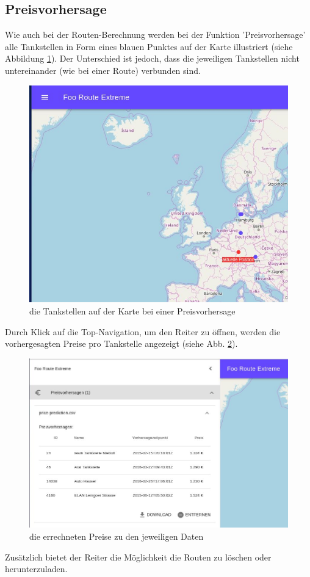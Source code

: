 \documentclass[
ngerman          %
,a4paper          %
,11pt
,pdftex
]{report}
\begin{document}
\subsection{Preisvorhersage}

Wie auch bei der Routen-Berechnung werden bei der Funktion 'Preisvorhersage' alle Tankstellen in Form eines blauen Punktes auf der Karte illustriert (siehe Abbildung \ref{fig:install6}).
Der Unterschied ist jedoch, dass die jeweiligen Tankstellen nicht untereinander (wie bei einer Route) verbunden sind.
\begin{figure}[H]
\centering
\includegraphics[width=0.6\linewidth]{install6.jpg}
\caption{die Tankstellen auf der Karte bei einer Preisvorhersage}
\label{fig:install6}
\end{figure}
Durch Klick auf die Top-Navigation, um den Reiter zu öffnen, werden die vorhergesagten Preise pro Tankstelle angezeigt (siehe Abb. \ref{fig:install7}).
\begin{figure}[H]
\centering
\includegraphics[width=0.8\linewidth]{install7.jpg}
\caption{die errechneten Preise zu den jeweiligen Daten}
\label{fig:install7}
\end{figure}

Zusätzlich bietet der Reiter die Möglichkeit die Routen zu löschen oder herunterzuladen.

\def\refname{Literaturverzeichnis}
\printbibliography[sorting=none]
\end{document}
